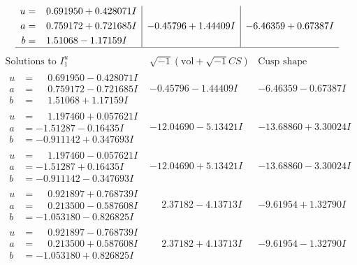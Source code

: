 \documentclass[1p]{elsarticle_modified}
\theoremstyle{definition}
\newcommand{\I}{\sqrt{-1}}
\begin{document}
$$\begin{array}{c|c|c}
\begin{aligned}
u &= \phantom{-}0.691950 + 0.428071 I \\
a &= \phantom{-}0.759172 + 0.721685 I \\
b &= \phantom{-}1.51068 - 1.17159 I\end{aligned}
 & -0.45796 + 1.44409 I & -6.46359 + 0.67387 I\\
 \hline 
 \end{array}$$\newpage$$\begin{array}{c|c|c}  
\text{Solutions to }I^u_{1}& \I (\text{vol} + \sqrt{-1}CS) & \text{Cusp shape}\\
 \hline 
\begin{aligned}
u &= \phantom{-}0.691950 - 0.428071 I \\
a &= \phantom{-}0.759172 - 0.721685 I \\
b &= \phantom{-}1.51068 + 1.17159 I\end{aligned}
 & -0.45796 - 1.44409 I & -6.46359 - 0.67387 I \\ \hline\begin{aligned}
u &= \phantom{-}1.197460 + 0.057621 I \\
a &= -1.51287 - 0.16435 I \\
b &= -0.911142 + 0.347693 I\end{aligned}
 & -12.04690 - 5.13421 I & -13.68860 + 3.30024 I \\ \hline\begin{aligned}
u &= \phantom{-}1.197460 - 0.057621 I \\
a &= -1.51287 + 0.16435 I \\
b &= -0.911142 - 0.347693 I\end{aligned}
 & -12.04690 + 5.13421 I & -13.68860 - 3.30024 I \\ \hline\begin{aligned}
u &= \phantom{-}0.921897 + 0.768739 I \\
a &= \phantom{-}0.213500 - 0.587608 I \\
b &= -1.053180 - 0.826825 I\end{aligned}
 & \phantom{-}2.37182 - 4.13713 I & -9.61954 + 1.32790 I \\ \hline\begin{aligned}
u &= \phantom{-}0.921897 - 0.768739 I \\
a &= \phantom{-}0.213500 + 0.587608 I \\
b &= -1.053180 + 0.826825 I\end{aligned}
 & \phantom{-}2.37182 + 4.13713 I & -9.61954 - 1.32790 I \\ \hline\begin{aligned}

\end{aligned}
\end{array}$$
\end{document}

